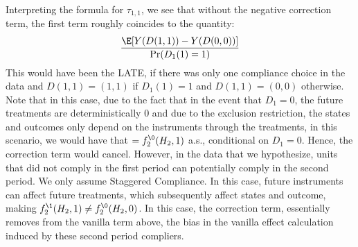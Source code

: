 Interpreting the formula for $\tau_{1,1}$, we see that without the negative correction term, the first term roughly coincides to the quantity:
\begin{align}
    \frac{\E[Y(D(1,1)) - Y(D(0,0))]}{\Pr(D_1(1)=1)}
\end{align}
This would have been the LATE, if there was only one compliance choice in the data and $D(1,1)=(1,1)$ if $D_1(1)=1$ and $D(1,1)=(0,0)$ otherwise. Note that in this case, due to the fact that in the event that $D_1=0$, the future treatments are deterministically $0$ and due to the exclusion restriction, the states and outcomes only depend on the instruments through the treatments, in this scenario, we would have that $ = f_2^{\0}(H_2,1)$ a.s., conditional on $D_1=0$. Hence, the correction term would cancel. However, in the data that we hypothesize, units that did not comply in the first period can potentially comply in the second period. We only assume Staggered Compliance. In this case, future instruments can affect future treatments, which subsequently affect states and outcome, making $f_2^{\1}(H_2, 1) \neq f_2^{\0}(H_2, 0)$. In this case, the correction term, essentially removes from the vanilla term above, the bias in the vanilla effect calculation induced by these second period compliers. 


